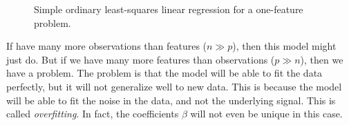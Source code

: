 \begin{figure}
  \centering
  \hspace*{1cm}%
  \caption{%
    Simple ordinary least-squares linear regression for a one-feature problem. }
  \label{fig:ols}
\end{figure}

If have many more observations than features (\(n \gg p\)), then this model might just do. But if we have many more features than observations (\(p \gg n\)), then we have a problem. The problem is that the model will be able to fit the data perfectly, but it will not generalize well to new data. This is because the model will be able to fit the noise in the data, and not the underlying signal. This is called \emph{overfitting}. In fact, the coefficients \(\beta\) will not even be unique in this case.

